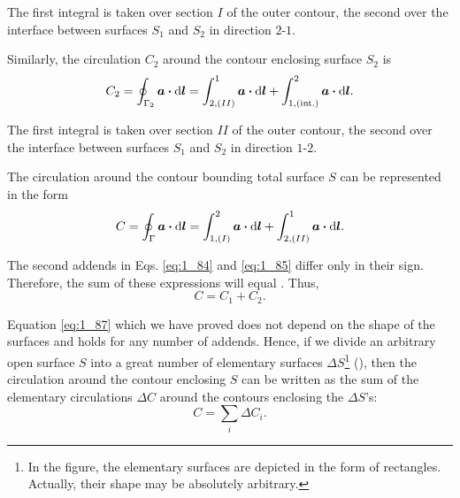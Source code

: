 \noindent
The first integral is taken over section $I$ of the outer contour, the second over the interface between surfaces $S_1$ and $S_2$ in direction $2$-$1$.

Similarly, the circulation $C_2$ around the contour enclosing surface $S_2$ is
\begin{equation}\label{eq:1_85}
	C_2 = \oint_{\Gamma_2} \boldsymbol{a} \boldsymbol{\cdot} \mathrm{d}\boldsymbol{l} = \int_{2,(II)}^1 \boldsymbol{a} \boldsymbol{\cdot} \mathrm{d}\boldsymbol{l} + \int_{1,(\text{int.})}^2 \boldsymbol{a} \boldsymbol{\cdot} \mathrm{d}\boldsymbol{l}.
\end{equation}

\noindent
The first integral is taken over section $II$ of the outer contour, the second over the interface between surfaces $S_1$ and $S_2$ in direction $1$-$2$.

The circulation around the contour bounding total surface $S$ can be represented in the form
\begin{equation}\label{eq:1_86}
	C = \oint_{\Gamma} \boldsymbol{a} \boldsymbol{\cdot} \mathrm{d}\boldsymbol{l} = \int_{1,(I)}^2 \boldsymbol{a} \boldsymbol{\cdot} \mathrm{d}\boldsymbol{l} + \int_{2,(II)}^1 \boldsymbol{a} \boldsymbol{\cdot} \mathrm{d}\boldsymbol{l}.
\end{equation}

\noindent
The second addends in Eqs. \eqref{eq:1_84} and \eqref{eq:1_85} differ only in their sign. Therefore, the sum of these expressions will equal . Thus,
\begin{equation}\label{eq:1_87}
	C = C_1 + C_2.
\end{equation}

Equation \eqref{eq:1_87} which we have proved does not depend on the shape of the surfaces and holds for any number of addends. Hence, if we divide an arbitrary open surface $S$ into a great number of elementary surfaces $\Delta{S}$\footnote{In the figure, the elementary surfaces are depicted in the form of rectangles. Actually, their shape may be absolutely arbitrary.} (), then the circulation around the contour enclosing $S$ can be written as the sum of the elementary circulations $\Delta{C}$ around the contours enclosing the $\Delta{S}$'s:
\begin{equation}\label{eq:1_88}
	C = \sum_i \Delta{C}_i.
\end{equation}

